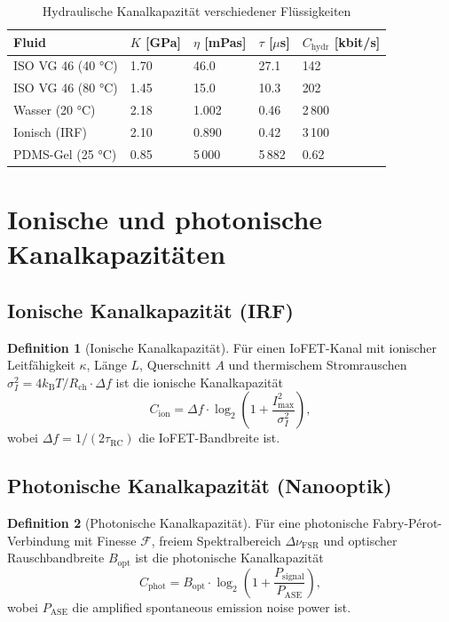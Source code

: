 ﻿\documentclass[a4paper,12pt]{scrreprt}
\theoremstyle{definition}
\newtheorem{definition}{Definition}[section]
\newcommand{\kb}{k_\mathrm{B}}
\begin{document}
\begin{table}[H]
\caption{Hydraulische Kanalkapazität verschiedener Flüssigkeiten}
\label{tab:nf5_kapaz}
\begin{tabular}{lllll}
\toprule
\textbf{Fluid} & $K$ [GPa] & $\eta$ [mPas] & $\tau$ [$\mu$s] & $C_{\mathrm{hydr}}$ [kbit/s] \\
\midrule
ISO VG 46 (40 °C) & 1.70 & 46.0  & 27.1 & 142 \\
ISO VG 46 (80 °C) & 1.45 & 15.0  & 10.3 & 202 \\
Wasser (20 °C)    & 2.18 & 1.002 & 0.46 & 2\,800 \\
Ionisch (IRF)    & 2.10 & 0.890 & 0.42 & 3\,100 \\
PDMS-Gel (25 °C)  & 0.85 & 5\,000 & 5\,882 & 0.62 \\
\bottomrule
\end{tabular}
\end{table}

\section{Ionische und photonische Kanalkapazitäten}

\subsection{Ionische Kanalkapazität (IRF)}

\begin{definition}[Ionische Kanalkapazität]
  Für einen IoFET-Kanal mit ionischer Leitfähigkeit $\kappa$,
  Länge $L$, Querschnitt $A$ und thermischem Stromrauschen
  $\sigma_I^2 = 4\kb T/R_{\mathrm{ch}} \cdot \Delta f$ ist die
  ionische Kanalkapazität
  \[
    C_{\mathrm{ion}} = \Delta f \cdot \log_2\!\left(1 +
    \frac{I_{\max}^2}{\sigma_I^2}\right),
  \]
  wobei $\Delta f = 1/(2\tau_{\mathrm{RC}})$ die IoFET-Bandbreite ist.
\end{definition}

\subsection{Photonische Kanalkapazität (Nanooptik)}

\begin{definition}[Photonische Kanalkapazität]
  Für eine photonische Fabry-Pérot-Verbindung mit Finesse $\mathcal{F}$,
  freiem Spektralbereich $\Delta\nu_{\mathrm{FSR}}$ und optischer
  Rauschbandbreite $B_{\mathrm{opt}}$ ist die photonische Kanalkapazität
  \[
    C_{\mathrm{phot}} = B_{\mathrm{opt}} \cdot \log_2\!\left(1 +
    \frac{P_{\mathrm{signal}}}{P_{\mathrm{ASE}}}\right),
  \]
  wobei $P_{\mathrm{ASE}}$ die amplified spontaneous emission noise power ist.
\end{definition}
\end{document}
